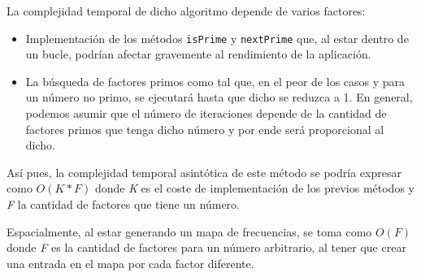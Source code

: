 La complejidad temporal de dicho algoritmo depende de varios factores:\begin{itemize}[leftmargin=13pt]
    \item Implementación de los métodos \texttt{isPrime} y \texttt{nextPrime} que, al estar dentro de un bucle, podrían afectar gravemente al rendimiento de la aplicación.
    \item La búsqueda de factores primos como tal que, en el peor de los casos y para un número no primo, se ejecutará hasta que dicho se reduzca a 1. En general, podemos asumir que el número de iteraciones depende de la cantidad de factores primos que tenga dicho número y por ende será proporcional al dicho.
\end{itemize}
Así pues, la complejidad temporal asintótica de este método se podría expresar como $O(K * F)$ donde \textit{K} es el coste de implementación de los previos métodos y \textit{F} la cantidad de factores que tiene un número.\bigskip

Espacialmente, al estar generando un mapa de frecuencias, se toma como $O(F)$ donde \textit{F} es la cantidad de factores para un número arbitrario, al tener que crear una entrada en el mapa por cada factor diferente.\bigskip

